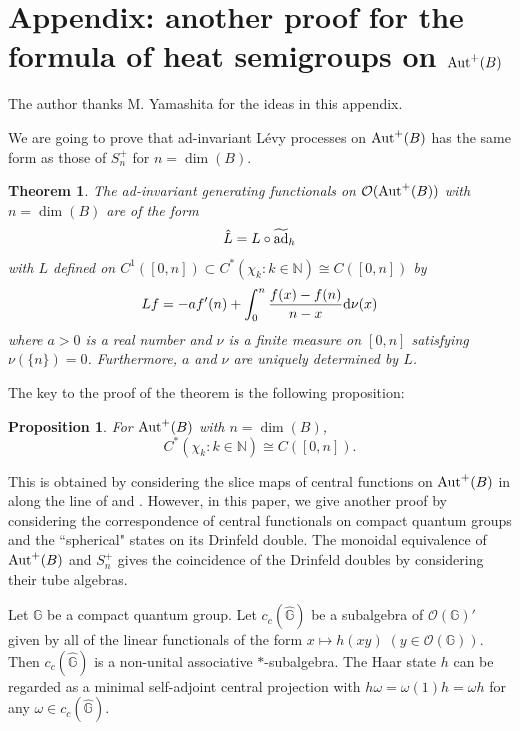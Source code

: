 \documentclass[12pt]{amsart}
\theoremstyle{plain} %
\newtheorem{theorem}[equation]{Theorem}
\newtheorem{proposition}[equation]{Proposition}
\theoremstyle{definition}
\theoremstyle{remark}
\begin{document}
 


 \section{Appendix: another proof for the formula of heat semigroups on ${\rm Aut}^+(B)$}
 
The author thanks M. Yamashita for the ideas in this appendix.
 
We are going to prove that ad-invariant L\'{e}vy processes on ${\rm Aut}^+(B)$ has the same form as those of $S_n^+$ for $n=\dim(B)$.

\begin{theorem}
The ad-invariant generating functionals on $\mathcal{O}({\rm Aut}^+(B))$ with $n=\dim(B)$ are of the form
\[
\hat{L}=L\circ \widetilde{{\rm ad}}_h
\]
with $L$ defined on $C^1([0, n])\subset C^*(\chi_k : k\in \mathbb{N})\cong C([0,n])$ by
\[
Lf = -a f'(n) + \int_{0}^n \frac{f(x) - f(n)}{n-x} {\rm d}\nu(x)
\]
where $a>0$ is a real number and $\nu$ is a finite measure on $[0,n]$ satisfying $\nu(\{n\})=0$. Furthermore, $a$ and $\nu$ are uniquely determined by $L$.

\end{theorem}

The key to the proof of the theorem is the following proposition:

 \begin{proposition}
 For ${\rm Aut}^+(B)$ with $n=\dim(B)$, 
 \[C^*(\chi_k : k\in \mathbb{N})\cong C([0,n]).\]
 \end{proposition}
 
 This is obtained by considering the slice maps of central functions on ${\rm Aut}^+(B)$ in \cite[Theorem 3.14]{BGJ2} along the line of \cite[Section 2]{DCFY} and \cite[Proposition 6.3]{MR3084500}. 
 However, in this paper, we give another proof by considering the correspondence of central functionals on compact quantum groups and the ``spherical" states on its Drinfeld double. The monoidal equivalence of ${\rm Aut}^+(B)$ and $S_n^+$ gives the coincidence of the Drinfeld doubles by considering their tube algebras.

Let $\mathbb{G}$ be a compact quantum group.
Let $c_c(\widehat{\mathbb{G}})$ be a subalgebra of $\mathcal{O}(\mathbb{G})'$ given by all of the linear functionals of the form $x \mapsto h(xy) \; (y\in \mathcal{O}(\mathbb{G})).$ Then $c_c(\widehat{\mathbb{G}})$ is a non-unital associative $*$-subalgebra. The Haar state $h$ can be regarded as a minimal self-adjoint central projection with $h\omega=\omega(1)h=\omega h$ for any $\omega \in c_c(\widehat{\mathbb{G}})$. 
\end{document}
